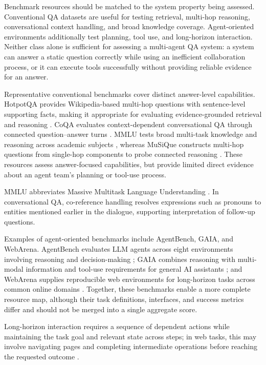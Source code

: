 \documentclass[a4paper,fleqn]{cas-dc}
\begin{document}
Benchmark resources should be matched to the system property being assessed.
Conventional QA datasets are useful for testing retrieval, multi-hop
reasoning, conversational context handling, and broad knowledge coverage.
Agent-oriented environments additionally test planning, tool use, and
long-horizon interaction. Neither class alone is sufficient for assessing a
multi-agent QA system: a system can answer a static question correctly while
using an inefficient collaboration process, or it can execute tools
successfully without providing reliable evidence for an answer.

Representative conventional benchmarks cover distinct answer-level
capabilities. HotpotQA provides Wikipedia-based multi-hop questions with
sentence-level supporting facts, making it appropriate for evaluating
evidence-grounded retrieval and reasoning \citep{yang2018hotpotqa}. CoQA
evaluates context-dependent conversational QA through connected
question--answer turns \citep{reddy2019coqa}. MMLU tests broad multi-task
knowledge and reasoning across academic subjects \citep{hendrycks2021mmlu},
whereas MuSiQue constructs multi-hop questions from single-hop components to
probe connected reasoning \citep{trivedi2022musique}. These resources assess
answer-focused capabilities, but provide limited direct evidence about an agent team's
planning or tool-use process.

MMLU abbreviates Massive Multitask Language Understanding
\citep{hendrycks2021mmlu}. In conversational QA, co-reference handling
resolves expressions such as pronouns to entities mentioned earlier in the
dialogue, supporting interpretation of follow-up questions.

Examples of agent-oriented benchmarks include AgentBench, GAIA, and WebArena.
AgentBench evaluates LLM agents across eight environments involving reasoning
and decision-making \citep{liu2024agentbench}; GAIA combines reasoning with
multi-modal information and tool-use requirements for general AI assistants
\citep{mialon2024gaia}; and WebArena supplies reproducible web environments
for long-horizon tasks across common online domains \citep{zhou2024webarena}.
Together, these benchmarks enable a more complete resource map, although
their task definitions, interfaces, and success metrics differ and should not
be merged into a single aggregate score.


Long-horizon interaction requires a sequence of dependent actions while
maintaining the task goal and relevant state across steps; in web tasks,
this may involve navigating pages and completing intermediate operations
before reaching the requested outcome \citep{zhou2024webarena}.
\end{document}
